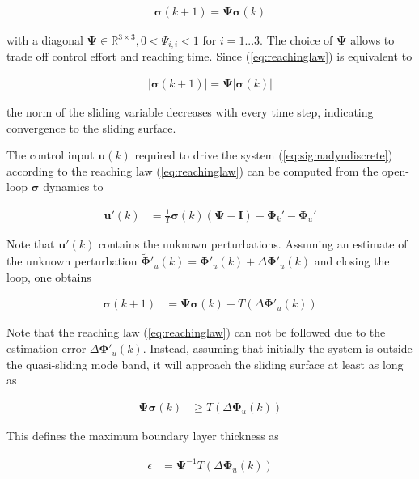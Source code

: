 \documentclass{ifacconf}
\providecommand{\mbf}[1]{\mathbf{#1}}
\begin{document}
\begin{align}
\mbf{\sigma}(k+1) = \mbf{\Psi} \mbf{\sigma}(k)
\label{eq:reachinglaw}
\end{align}


with a diagonal $\mbf{\Psi} \in \mathbb{R}^{3 \times 3}, 0 < \Psi_{i,i} < 1$ for $i=1...3$. The choice of $\mbf{\Psi}$ allows to trade off control effort and reaching time.
Since (\ref{eq:reachinglaw}) is equivalent to

\begin{align}
|\mbf{\sigma}(k+1)| = \mbf{\Psi} |\mbf{\sigma}(k)|
\end{align}

the norm of the sliding variable decreases with every time step, indicating convergence to the sliding surface.

The control input $\mbf{u}(k)$ required to drive the system (\ref{eq:sigmadyndiscrete}) according to the reaching law (\ref{eq:reachinglaw}) can be computed from the open-loop $\mbf{\sigma}$ dynamics to

\begin{align}
\mbf{u}'(k) &= \frac{1}{T}\mbf{\sigma}(k)(\mbf{\Psi} - \mbf{I}) - \mbf{\Phi}_k' - \mbf{\Phi}_u'
\end{align}

Note that $\mbf{u}'(k)$ contains the unknown perturbations. Assuming an estimate of the unknown perturbation $\tilde{\mbf{\Phi}}'_u(k) = \mbf{\Phi}'_u(k) + \Delta \mbf{\Phi}'_u(k)$ and closing the loop, one obtains

\begin{align}
\mbf{\sigma}(k+1) &= \mbf{\Psi} \mbf{\sigma}(k) + 
T (\Delta \mbf{\Phi}'_u(k))  
\end{align}

Note that the reaching law (\ref{eq:reachinglaw}) can not be followed due to the estimation error $\Delta \mbf{\Phi}'_u(k)$. Instead, assuming that initially the system is outside the quasi-sliding mode band, it will approach the sliding surface at least as long as

\begin{align}
\mbf{\Psi} \mbf{\sigma}(k) & \geq T (\Delta \mbf{\Phi}_u(k))   
\end{align}

This defines the maximum boundary layer thickness as

\begin{align}
\epsilon &= 
\mbf{\Psi}^{-1} T (\Delta \mbf{\Phi}_u(k))
\label{eq:achievableepsilon}
\end{align}
\end{document}
